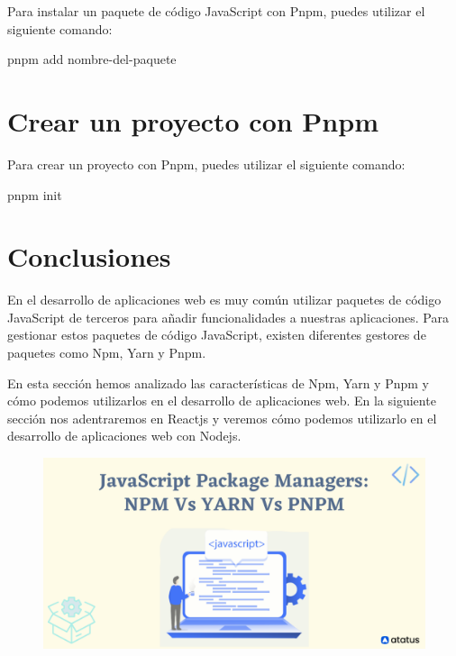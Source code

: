 \documentclass[
  a4paper,
  DIV=11,
  numbers=noendperiod,
  onepage,
  openany]{scrreprt}
\newenvironment{Shaded}{\begin{snugshade}}{\end{snugshade}}
\newcommand{\ExtensionTok}[1]{\textcolor[rgb]{0.00,0.23,0.31}{#1}}
\newcommand{\NormalTok}[1]{\textcolor[rgb]{0.00,0.23,0.31}{#1}}
\begin{document}
\begin{tcolorbox}
Para instalar un paquete de código JavaScript con Pnpm, puedes utilizar
el siguiente comando:

\begin{Shaded}
\begin{Highlighting}[]
\ExtensionTok{pnpm}\NormalTok{ add nombre{-}del{-}paquete}
\end{Highlighting}
\end{Shaded}

\section{Crear un proyecto con Pnpm}\label{crear-un-proyecto-con-pnpm}

Para crear un proyecto con Pnpm, puedes utilizar el siguiente comando:

\begin{Shaded}
\begin{Highlighting}[]
\ExtensionTok{pnpm}\NormalTok{ init}
\end{Highlighting}
\end{Shaded}

\section{Conclusiones}\label{conclusiones-4}

En el desarrollo de aplicaciones web es muy común utilizar paquetes de
código JavaScript de terceros para añadir funcionalidades a nuestras
aplicaciones. Para gestionar estos paquetes de código JavaScript,
existen diferentes gestores de paquetes como Npm, Yarn y Pnpm.

En esta sección hemos analizado las características de Npm, Yarn y Pnpm
y cómo podemos utilizarlos en el desarrollo de aplicaciones web. En la
siguiente sección nos adentraremos en Reactjs y veremos cómo podemos
utilizarlo en el desarrollo de aplicaciones web con Nodejs.

\begin{figure}[H]

{\centering \includegraphics{images/npm-vs-yarn-vs-pnpm-1.png}

}
\end{figure}
\end{tcolorbox}
\end{document}
